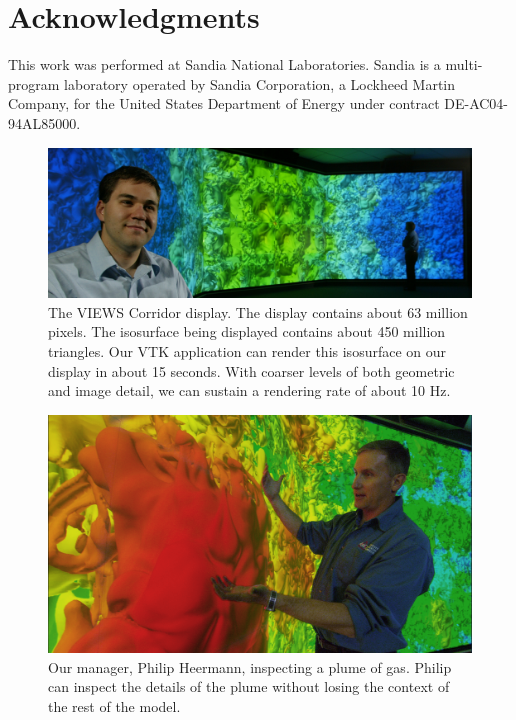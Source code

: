 \documentclass{acmsiggraph}
\newcommand{\sticky}[1]{}
\begin{document}
  \section{Acknowledgments}

  This work was performed at Sandia National Laboratories.  Sandia is a
  multi-program laboratory operated by Sandia Corporation, a Lockheed
  Martin Company, for the United States Department of Energy under contract
  DE-AC04-94AL85000.


  
  

  \begin{figure}[!p]
    \includegraphics[width=\textwidth]{images/FullWall}
    \caption{The VIEWS Corridor display.  The display contains about 63
    million pixels.  The isosurface being displayed contains about 450
    million triangles.  Our VTK application can render this isosurface on
    our display in about 15 seconds.  With coarser levels of both geometric
    and image detail, we can sustain a rendering rate of about 10 Hz.
    \sticky{Might want to verify that.}}
    \label{fig:fullwall}
  \end{figure}

  \begin{figure}[!p]
    \includegraphics[width=\textwidth]{images/PhilwBlob}
    \caption{Our manager, Philip Heermann, inspecting a plume of gas.
    Philip can inspect the details of the plume without losing the context
    of the rest of the model.}
    \label{fig:philwblob}
  \end{figure}
\end{document}
